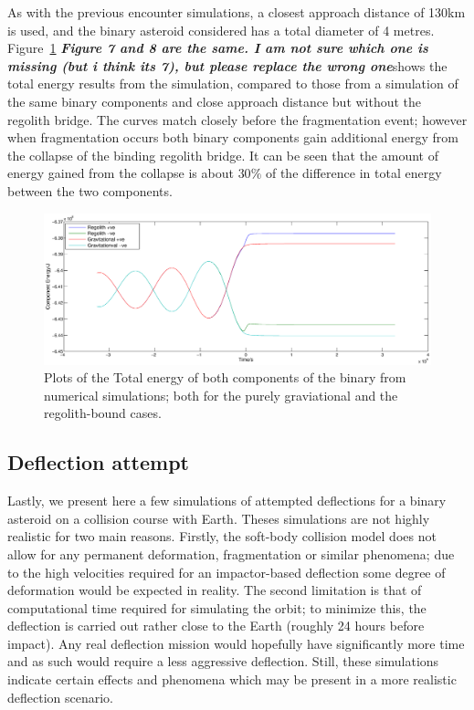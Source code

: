 \documentclass[letterpaper, preprint, paper,11pt]{AAS}	%
\begin{document}
As with the previous encounter simulations, a closest approach distance of 130km is used, and the binary asteroid considered has a total diameter of 4 metres. Figure~\ref{fig:reg} \textbf{\emph{Figure 7 and 8 are the same. I am not sure which one is missing (but i think its 7), but please replace the wrong one}}shows the total energy results from the simulation, compared to those from a simulation of the same binary components and close approach distance but without the regolith bridge. The curves match closely before the fragmentation event; however when fragmentation occurs both binary components gain additional energy from the collapse of the binding regolith bridge. It can be seen that the amount of energy gained from the collapse is about $30\%$ of the difference in total energy between the two components.
 
\begin{figure}[H]
\centering
\centerline{\includegraphics[width=1.2\textwidth]{regolith_v_gravitational.eps}} 
\caption{Plots of the Total energy of both components of the binary from numerical simulations; both for the purely graviational and the regolith-bound cases.} 
\label{fig:reg}
\end{figure}

\subsection{Deflection attempt}

Lastly, we present here a few simulations of attempted deflections for a binary asteroid on a collision course with Earth. Theses simulations are not highly realistic for two main reasons. Firstly, the soft-body collision model does not allow for any permanent deformation, fragmentation or similar phenomena; due to the high velocities required for an impactor-based deflection some degree of deformation would be expected in reality. The second limitation is that of computational time required for simulating the orbit; to minimize this, the deflection is carried out rather close to the Earth (roughly 24 hours before impact). Any real deflection mission would hopefully have significantly more time and as such would require a less aggressive deflection. Still, these simulations indicate certain effects and phenomena which may be present in a more realistic deflection scenario. 
\end{document}
